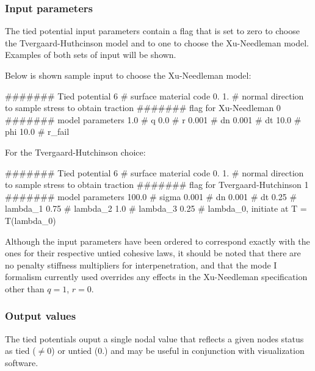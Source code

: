 \subsubsection{Input parameters}
The tied potential input parameters contain a flag that is set to
zero to choose the Tvergaard-Huthcinson model and to one to choose
the Xu-Needleman model. Examples of both sets of input will be shown.

Below is shown sample input to choose the Xu-Needleman model:
\begin{inputfile}
####### Tied potential
6     # surface material code
0. 1. # normal direction to sample stress to obtain traction
####### flag for Xu-Needleman
0
####### model parameters
1.0   # q
0.0   # r 
0.001 # dn
0.001 # dt
10.0  # phi
10.0  # r_fail
\end{inputfile}

For the Tvergaard-Hutchinson choice:
\begin{inputfile}
####### Tied potential
6     # surface material code
0. 1. # normal direction to sample stress to obtain traction
####### flag for Tvergaard-Hutchinson
1
####### model parameters
100.0 # sigma
0.001 # dn
0.001 # dt
0.25  # lambda_1
0.75  # lambda_2
1.0   # lambda_3
0.25  # lambda_0, initiate at T = T(lambda_0)
\end{inputfile}

Although the input parameters have been ordered to correspond exactly
with the ones for their respective untied cohesive laws, it should be
noted that there are no penalty stiffness multipliers for interpenetration,
and that the mode I formalism currently used overrides any effects in
the Xu-Needleman specification other than $q = 1$, $r = 0$. 

\subsubsection{Output values}
The tied potentials ouput a single nodal value that reflects a given
nodes status as tied ($\neq 0$) or untied ($0.$) and may be useful in conjunction
with visualization software. 

